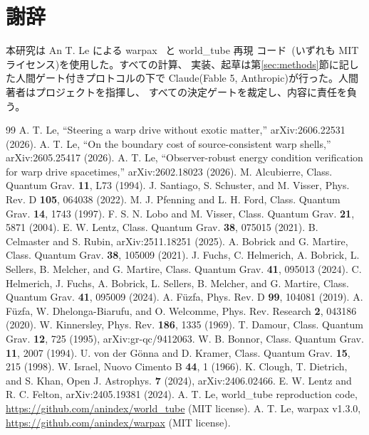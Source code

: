 \documentclass[11pt]{article}
\begin{document}
\section*{謝辞}

本研究は An T. Le による warpax~\cite{warpax-code} と world\_tube 再現
コード~\cite{worldtube}(いずれも MIT ライセンス)を使用した。すべての計算、
実装、起草は第\ref{sec:methods}節に記した人間ゲート付きプロトコルの下で
Claude(Fable 5, Anthropic)が行った。人間著者はプロジェクトを指揮し、
すべての決定ゲートを裁定し、内容に責任を負う。

\begin{thebibliography}{99}
 A. T. Le, ``Steering a warp drive without exotic
matter,'' arXiv:2606.22531 (2026).
 A. T. Le, ``On the boundary cost of source-consistent
warp shells,'' arXiv:2605.25417 (2026).
 A. T. Le, ``Observer-robust energy condition
verification for warp drive spacetimes,'' arXiv:2602.18023 (2026).
 M. Alcubierre, Class. Quantum Grav. \textbf{11}, L73
(1994).
 J. Santiago, S. Schuster, and M. Visser, Phys. Rev. D
\textbf{105}, 064038 (2022).
 M. J. Pfenning and L. H. Ford, Class. Quantum Grav.
\textbf{14}, 1743 (1997).
 F. S. N. Lobo and M. Visser, Class. Quantum Grav.
\textbf{21}, 5871 (2004).
 E. W. Lentz, Class. Quantum Grav. \textbf{38}, 075015
(2021).
 B. Celmaster and S. Rubin, arXiv:2511.18251 (2025).
 A. Bobrick and G. Martire, Class. Quantum Grav.
\textbf{38}, 105009 (2021).
 J. Fuchs, C. Helmerich, A. Bobrick, L. Sellers,
B. Melcher, and G. Martire, Class. Quantum Grav. \textbf{41}, 095013
(2024).
 C. Helmerich, J. Fuchs, A. Bobrick, L. Sellers,
B. Melcher, and G. Martire, Class. Quantum Grav. \textbf{41}, 095009
(2024).
 A. F\"uzfa, Phys. Rev. D \textbf{99}, 104081 (2019).
 A. F\"uzfa, W. Dhelonga-Biarufu, and O. Welcomme,
Phys. Rev. Research \textbf{2}, 043186 (2020).
 W. Kinnersley, Phys. Rev. \textbf{186}, 1335 (1969).
 T. Damour, Class. Quantum Grav. \textbf{12}, 725 (1995),
arXiv:gr-qc/9412063.
 W. B. Bonnor, Class. Quantum Grav. \textbf{11}, 2007
(1994).
 U. von der G\"onna and D. Kramer, Class. Quantum Grav.
\textbf{15}, 215 (1998).
 W. Israel, Nuovo Cimento B \textbf{44}, 1 (1966).
 K. Clough, T. Dietrich, and S. Khan, Open J. Astrophys.
\textbf{7} (2024), arXiv:2406.02466.
 E. W. Lentz and R. C. Felton, arXiv:2405.19381
(2024).
 A. T. Le, world\_tube reproduction code,
\url{https://github.com/anindex/world_tube} (MIT license).
 A. T. Le, warpax v1.3.0,
\url{https://github.com/anindex/warpax} (MIT license).
\end{thebibliography}
\end{document}
